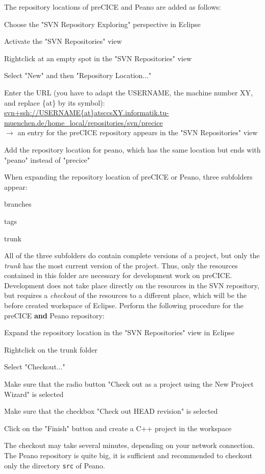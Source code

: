 \documentclass[11pt, oneside]{scrartcl}
\begin{document}
The repository locations of preCICE and Peano are added as follows:
\begin{enumerate*}
\item Choose the "SVN Repository Exploring" perspective in Eclipse
\item Activate the "SVN Repositories" view
\item Rightclick at an empty spot in the "SVN Repositories" view
\item Select "New" and then "Repository Location..."
\item Enter the URL (you have to adapt the USERNAME, the machine number XY,
and replace \{at\} by its symbol):
\url{svn+ssh://USERNAME{at}atsccsXY.informatik.tu-muenchen.de/home_local/repositories/svn/precice}
\\ $\rightarrow$ an entry for the preCICE repository appears in the "SVN Repositories" view
\item Add the repository location for peano, which has the same location
but ends with "peano" instead of "precice"
\end{enumerate*}

When expanding the repository location of preCICE or Peano, three subfolders
appear:
\begin{itemize*}
\item branches
\item tags
\item trunk
\end{itemize*}

All of the three subfolders do contain complete versions of a project, but only
the \textit{trunk} has the most current version of the project. Thus, only the
resources contained in this folder are necessary for development work on
preCICE. Development does not take place directly on the resources in the SVN
repository, but requires a \textit{checkout} of the resources to a different
place, which will be the before created workspace of Eclipse. Perform the
following procedure for the preCICE \textbf{and} Peano repository:

\begin{enumerate*}
\item Expand the repository location in the "SVN Repositories" view in Eclipse
\item Rightclick on the trunk folder
\item Select "Checkout..."
\item Make sure that the radio button "Check out as a project using the New
Project Wizard" is selected
\item Make sure that the checkbox "Check out HEAD revision" is selected
\item Click on the "Finish" button and create a C++ project in the workspace
\end{enumerate*}
The checkout may take several minutes, depending on your network connection. The
Peano repository is quite big, it is sufficient and recommended to checkout only
the directory \verb$src$ of Peano.
\end{document}
